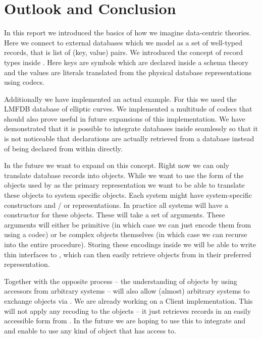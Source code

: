 \section{Outlook and Conclusion}\label{sec:conclusion}

In this report we introduced the basics of how we imagine \MMT data-centric theories. Here
we connect to external databases which we model as a set of well-typed records, that is
list of (key, value) pairs. We introduced the concept of record types inside \MMT. Here
keys are symbols which are declared inside a schema theory and the values are \MMT
literals translated from the physical database representations using codecs.

Additionally we have implemented an actual example. For this we used the LMFDB database of
elliptic curves. We implemented a multitude of codecs that should also prove useful in
future expansions of this implementation. We have demonstrated that it is possible to
integrate databases inside \MMT seamlessly so that it is not noticeable that declarations
are actually retrieved from a database instead of being declared from within \MMT
directly.

In the future we want to expand on this concept. Right now we can only translate database
records into \MMT objects. While we want to use the form of the objects used by \MMT as
the primary representation we want to be able to translate these objects to system specific
objects. Each system might have system-specific constructors and / or representations. In
practice all systems will have a constructor for these objects. These will take a set of
arguments. These arguments will either be primitive (in which case we can just encode them
from \MMT using a codec) or be complex objects themselves (in which case we can recurse
into the entire procedure). Storing these encodings inside \MMT we will be able to write
thin interfaces to \MMT, which can then easily retrieve objects from \MMT in their
preferred representation.

Together with the opposite process -- the understanding of objects by using accessors from
arbitrary systems -- will also allow (almost) arbitrary systems to exchange objects via
\MMT. We are already working on a \python Client implementation. This will not apply any
recoding to the objects -- it just retrieves records in an easily accessible form from
\MMT. In the future we are hoping to use this to integrate \MMT and \GAP and enable \GAP
to use any kind of object that \MMT has access to.

